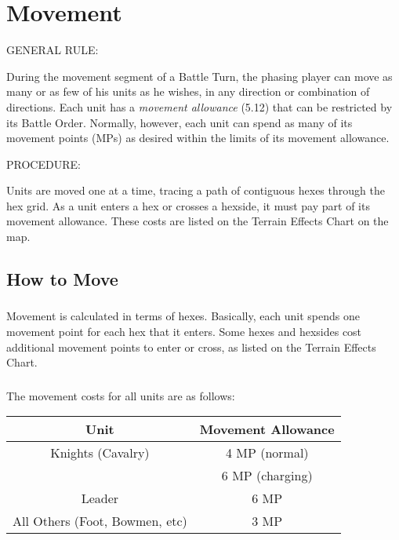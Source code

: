 \section{Movement}

GENERAL RULE:

During the movement segment of a Battle Turn, the phasing player can move as many or as few of his units as he wishes, in any direction or combination of directions. Each unit has a \textit{movement allowance} (5.12) that can be restricted by its Battle Order. Normally, however, each unit can spend as many of its movement points (MPs) as desired within the limits of its movement allowance.

PROCEDURE:

Units are moved one at a time, tracing a path of contiguous hexes through the hex grid. As a unit enters a hex or crosses a hexside, it must pay part of its movement allowance. These costs are listed on the Terrain Effects Chart on the map.

\subsection{How to Move}

\subsubsection[Movement Calculation]{} Movement is calculated in terms of hexes. Basically, each unit spends one movement point for each hex that it enters. Some hexes and hexsides cost additional movement points to enter or cross, as listed on the Terrain Effects Chart.

\subsubsection[Movement Costs]{} The movement costs for all units are as follows:

\begin{center}
  \begin{tabular}{ |c|c| }
    \hline
    \textbf{Unit} & \textbf{Movement Allowance} \\
    \hline
    Knights (Cavalry) & 4 MP (normal) \\
    & 6 MP (charging) \\
    Leader & 6 MP \\
    All Others (Foot, Bowmen, etc) & 3 MP \\
    \hline
  \end{tabular}
\end{center}

